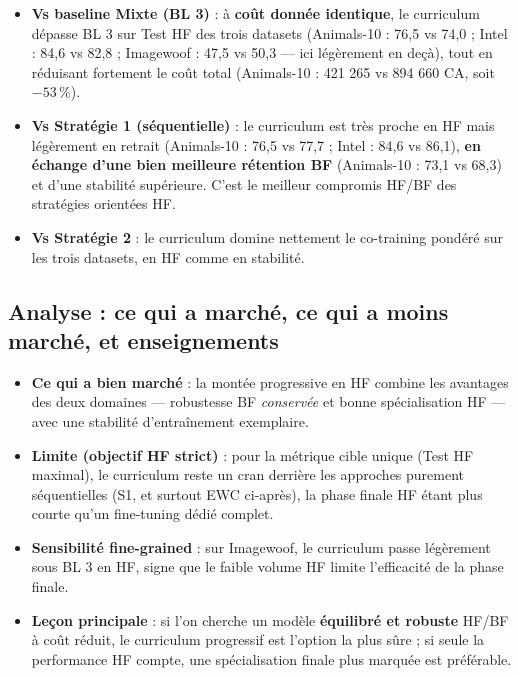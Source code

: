 \documentclass[11pt,a4paper,openany]{book}
\begin{document}
\begin{itemize}
  \item \textbf{Vs baseline Mixte (BL 3)} : à \textbf{coût donnée identique}, le curriculum dépasse BL 3 sur Test HF des trois datasets (Animals-10 : 76,5 vs 74,0 ; Intel : 84,6 vs 82,8 ; Imagewoof : 47,5 vs 50,3 — ici légèrement en deçà), tout en réduisant fortement le coût total (Animals-10 : 421 265 vs 894 660 CA, soit $-53$\,\%).
  \item \textbf{Vs Stratégie 1 (séquentielle)} : le curriculum est très proche en HF mais légèrement en retrait (Animals-10 : 76,5 vs 77,7 ; Intel : 84,6 vs 86,1), \textbf{en échange d'une bien meilleure rétention BF} (Animals-10 : 73,1 vs 68,3) et d'une stabilité supérieure. C'est le meilleur compromis HF/BF des stratégies orientées HF.
  \item \textbf{Vs Stratégie 2} : le curriculum domine nettement le co-training pondéré sur les trois datasets, en HF comme en stabilité.
\end{itemize}

\subsection{Analyse : ce qui a marché, ce qui a moins marché, et enseignements}

\begin{itemize}
  \item \textbf{Ce qui a bien marché} : la montée progressive en HF combine les avantages des deux domaines — robustesse BF \emph{conservée} et bonne spécialisation HF — avec une stabilité d'entraînement exemplaire.
  \item \textbf{Limite (objectif HF strict)} : pour la métrique cible unique (Test HF maximal), le curriculum reste un cran derrière les approches purement séquentielles (S1, et surtout EWC ci-après), la phase finale HF étant plus courte qu'un fine-tuning dédié complet.
  \item \textbf{Sensibilité fine-grained} : sur Imagewoof, le curriculum passe légèrement sous BL 3 en HF, signe que le faible volume HF limite l'efficacité de la phase finale.
  \item \textbf{Leçon principale} : si l'on cherche un modèle \textbf{équilibré et robuste} HF/BF à coût réduit, le curriculum progressif est l'option la plus sûre ; si seule la performance HF compte, une spécialisation finale plus marquée est préférable.
\end{itemize}
\end{document}
